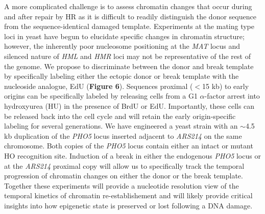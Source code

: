 A more complicated challenge is to assess chromatin changes that occur during and after repair by HR as %
it is difficult to readily distinguish the donor sequence from the sequence-identical damaged template. 
Experiments at the mating type loci in yeast have begun to elucidate specific changes in chromatin structure\citep{Hicks2011-di,Tsabar2016-le}; however, the inherently poor nucleosome positioning at the \textit{MAT} locus\citep{Weiss1998-lq} and silenced nature of \textit{HML} and \textit{HMR} loci\citep{Rusche2003-wy} may not be representative of the rest of the genome.  
We propose to discriminate between the donor and break template by specifically labeling either the ectopic donor or break template with the nucleoside analogue, EdU ({\color{dukeblue}\textbf{Figure 6}}). Sequences proximal ($<$15 kb) to early origins can be specifically labeled %
by releasing cells from a G1 $\alpha$-factor arrest into hydroxyurea (HU) in the presence of BrdU or EdU\citep{Peace2016-rb,Belsky2015-li}.  Importantly, these cells can be released back into the cell cycle and will retain the early origin-specific labeling for several generations. %
We have engineered a yeast strain with an $\sim$4.5 kb duplication of the  \textit{PHO5} locus inserted adjacent to  \textit{ARS214} on the same chromosome.  Both copies of the \textit{PHO5} locus contain either an intact or mutant HO recognition site. Induction of a break in either the endogenous \textit{PHO5} locus or at the \textit{ARS214} proximal copy will allow us to specifically track the temporal progression of chromatin changes on either the donor or the break template.  Together these experiments will provide a nucleotide resolution view of the temporal kinetics of chromatin re-establishement and will likely provide critical insights into how epigenetic state is preserved or lost following a DNA damage.




